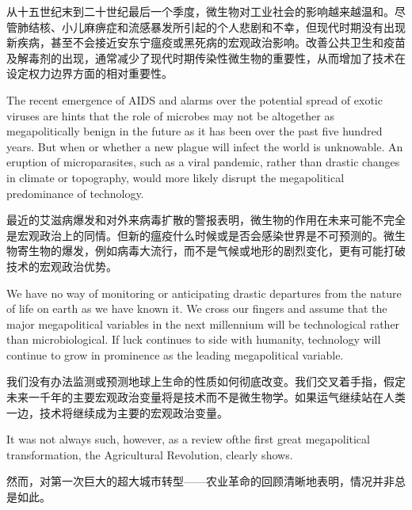 \begin{Parallel}{97mm}{45mm}
  \ParallelRText
  {从十五世纪末到二十世纪最后一个季度，微生物对工业社会的影响越来越温和。尽管肺结核、小儿麻痹症和流感暴发所引起的个人悲剧和不幸，但现代时期没有出现新疾病，甚至不会接近安东宁瘟疫或黑死病的宏观政治影响。改善公共卫生和疫苗及解毒剂的出现，通常减少了现代时期传染性微生物的重要性，从而增加了技术在设定权力边界方面的相对重要性。}
  \ParallelPar


  \ParallelLText
  {The recent emergence of AIDS and alarms over the potential spread of exotic viruses are hints that the role of microbes may not be altogether as megapolitically benign in the future as it has been over the past five hundred years. But when or whether a new plague will infect the world is unknowable. An eruption of microparasites, such as a viral pandemic, rather than drastic changes in climate or topography, would more likely disrupt the megapolitical predominance of technology.}
  
  \ParallelRText
  {最近的艾滋病爆发和对外来病毒扩散的警报表明，微生物的作用在未来可能不完全是宏观政治上的同情。但新的瘟疫什么时候或是否会感染世界是不可预测的。微生物寄生物的爆发，例如病毒大流行，而不是气候或地形的剧烈变化，更有可能打破技术的宏观政治优势。}
  \ParallelPar



  \ParallelLText
  {We have no way of monitoring or anticipating drastic departures from the nature of life on earth as we have known it. We cross our fingers and assume that the major megapolitical variables in the next millennium will be technological rather than microbiological. If luck continues to side with humanity, technology will continue to grow in prominence as the leading megapolitical variable.}
  
  \ParallelRText
  {我们没有办法监测或预测地球上生命的性质如何彻底改变。我们交叉着手指，假定未来一千年的主要宏观政治变量将是技术而不是微生物学。如果运气继续站在人类一边，技术将继续成为主要的宏观政治变量。}
  \ParallelPar



  \ParallelLText
  {It was not always such, however, as a review ofthe first great megapolitical transformation, the Agricultural Revolution, clearly shows.}
  
  \ParallelRText
  {然而，对第一次巨大的超大城市转型——农业革命的回顾清晰地表明，情况并非总是如此。}
  \ParallelPar

\end{Parallel}